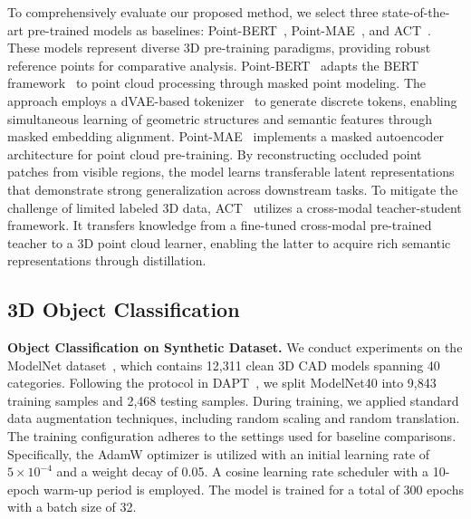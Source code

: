 To comprehensively evaluate our proposed method, we select three state-of-the-art pre-trained models as baselines: Point-BERT~\cite{yu2022point}, Point-MAE~\cite{pang2022masked}, and ACT~\cite{dong2022autoencoders}. These models represent diverse 3D pre-training paradigms, providing robust reference points for comparative analysis.
Point-BERT~\cite{yu2022point} adapts the BERT framework~\cite{devlin2018bert} to point cloud processing through masked point modeling. The approach employs a dVAE-based tokenizer~\cite{vahdat2018dvae} to generate discrete tokens, enabling simultaneous learning of geometric structures and semantic features through masked embedding alignment.
Point-MAE~\cite{pang2022masked} implements a masked autoencoder architecture for point cloud pre-training. By reconstructing occluded point patches from visible regions, the model learns transferable latent representations that demonstrate strong generalization across downstream tasks.
To mitigate the challenge of limited labeled 3D data, ACT~\cite{dong2022autoencoders} utilizes a cross-modal teacher-student framework. It transfers knowledge from a fine-tuned cross-modal pre-trained teacher to a 3D point cloud learner, enabling the latter to acquire rich semantic representations through distillation.


\subsection{3D Object Classification}
\label{sec:classification}

\textbf{Object Classification on Synthetic Dataset.} We conduct experiments on the ModelNet dataset~\cite{wu20153d}, which contains 12,311 clean 3D CAD models spanning 40 categories. Following the protocol in DAPT~\cite{zhou2024dynamic}, we split ModelNet40 into 9,843 training samples and 2,468 testing samples. During training, we applied standard data augmentation techniques, including random scaling and random translation. The training configuration adheres to the settings used for baseline comparisons. Specifically, the AdamW optimizer is utilized with an initial learning rate of $5 \times 10^{-4}$ and a weight decay of 0.05. A cosine learning rate scheduler with a 10-epoch warm-up period is employed. The model is trained for a total of 300 epochs with a batch size of 32. 

